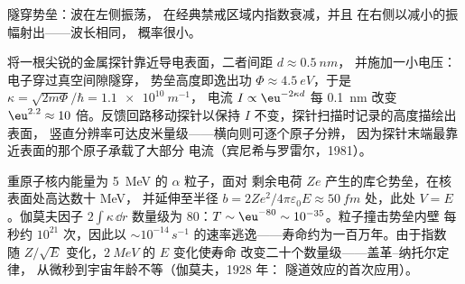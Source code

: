 \begin{omfigure}

{\small 隧穿势垒：波在左侧振荡，
在经典禁戒区域内指数衰减，并且
在右侧以减小的振幅射出——波长相同，
概率很小。}
\end{omfigure}

\begin{example}[扫描隧道显微镜]\label{ex:b2:potential-wells-tunneling:stm}
将一根尖锐的金属探针靠近导电表面，二者间距 $d \approx \qty{0.5}{nm}$，
并施加一小电压：电子穿过真空间隙隧穿，
势垒高度即逸出功 $\Phi \approx
\qty{4.5}{eV}$，于是 $\kappa = \sqrt{2m\Phi}/\hbar = \qty{1.1e10}{m^{-1}}$，
电流 $I \propto \eu^{-2\kappa d}$ 每 \qty{0.1}{nm} 改变 $\eu^{2.2} \approx
10$ 倍。反馈回路移动探针以保持 $I$
不变，探针扫描时记录的高度描绘出表面，
竖直分辨率可达皮米量级——横向则可逐个原子分辨，
因为探针末端最靠近表面的那个原子承载了大部分
电流（宾尼希与罗雷尔，1981）。
\end{example}

\begin{example}[α 衰变]\label{ex:b2:potential-wells-tunneling:alpha}
重原子核内能量为 \qty{5}{MeV} 的 $\alpha$ 粒子，面对
剩余电荷 $Ze$ 产生的库仑势垒，在核表面处高达数十 MeV，
并延伸至半径 $b = 2Ze^2/4\pi\varepsilon_0E
\approx \qty{50}{fm}$ 处，此处 $V = E$。伽莫夫因子 $2\int\kappa\,\dd r$
数量级为 $80$：$T \sim \eu^{-80} \sim 10^{-35}$。粒子撞击势垒内壁
每秒约 $10^{21}$ 次，因此以 $\sim 10^{-14}
\,\unit{s^{-1}}$ 的速率逃逸——寿命约为一百万年。由于指数
随 $Z/\sqrt E$ 变化，$\qty{2}{MeV}$ 的 $E$ 变化使寿命
改变二十个数量级——盖革–纳托尔定律，
从微秒到宇宙年龄不等（伽莫夫，1928 年：
隧道效应的首次应用）。
\end{example}


